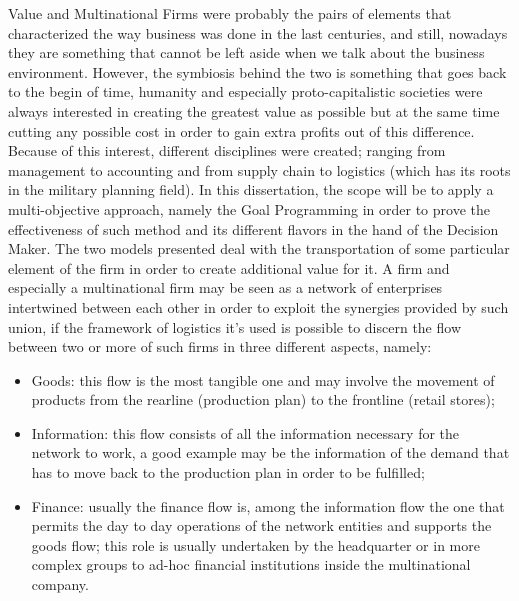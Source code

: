 \begin{doublespace}
Value and Multinational Firms were probably the pairs of elements that characterized the way business was done in the last centuries, and still, nowadays they are something that cannot be left aside when we talk about the business environment. However, the symbiosis behind the two is something that goes back to the begin of time, humanity and especially proto-capitalistic societies were always interested in creating the greatest value as possible but at the same time cutting any possible cost in order to gain extra profits out of this difference.
\\
Because of this interest, different disciplines were created; ranging from management to accounting and from supply chain to logistics (which has its roots in the military planning field). In this dissertation, the scope will be to apply a multi-objective approach, namely the Goal Programming in order to prove the effectiveness of such method and its different flavors in the hand of the Decision Maker. The two models presented deal with the transportation of some particular element of the firm in order to create additional value for it. A firm and especially a multinational firm may be seen as a network of enterprises intertwined between each other in order to exploit the synergies provided by such union, if the framework of logistics it's used is possible to discern the flow between two or more of such firms in three different aspects, namely:

\begin{itemize}
 \item Goods: this flow is the most tangible one and may involve the movement of products from the rearline (production plan) to the frontline (retail stores);    
\item Information: this flow consists of all the information necessary for the network to work, a good example may be the information of the demand that has to move back to the production plan in order to be fulfilled;
\item Finance: usually the finance flow is, among the information flow the one that permits the day to day operations of the network entities and supports the goods flow; this role is usually undertaken by the headquarter or in more complex groups to ad-hoc financial institutions inside the multinational company. 
\end{itemize}


\end{doublespace}
